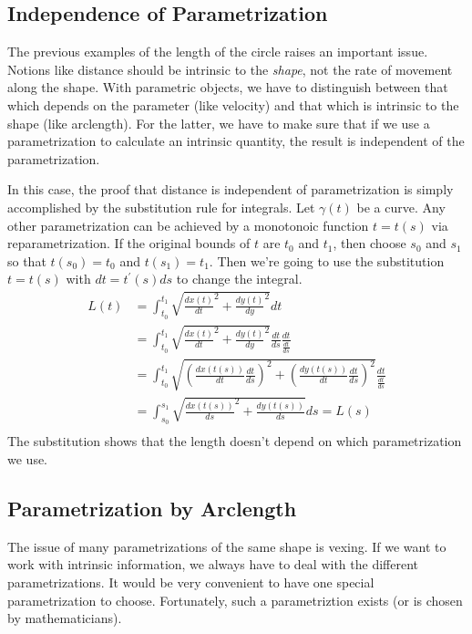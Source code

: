 \documentclass[fleqn]{report}
\begin{document}
\subsection{Independence of Parametrization}
\label{independence-parametrization}

The previous examples of the length of the circle raises an
important issue. Notions like distance should be intrinsic
to the \emph{shape}, not the rate of movement along the shape.
With parametric objects, we have to distinguish between that
which depends on the parameter (like velocity) and that which
is intrinsic to the shape (like arclength). For the
latter, we have to make sure that if we use a parametrization
to calculate an intrinsic quantity, the result is independent
of the parametrization.

In this case, the proof that distance is independent of
parametrization is simply accomplished by the substitution
rule for integrals. Let $\gamma(t)$ be a curve. Any other
parametrization can be achieved by a monotonoic function $t =
t(s)$ via reparametrization. If the original bounds of $t$
are $t_0$ and $t_1$, then choose $s_0$ and $s_1$ so that
$t(s_0) = t_0$ and $t(s_1) = t_1$. Then we're going to use the
substitution $t = t(s)$ with $dt = t^\prime(s) ds$ to change
the integral. 
\begin{align*}
L(t) & = \int_{t_0}^{t_1} \sqrt{ \frac{dx(t)}{dt}^2 +
\frac{dy(t)}{dy}^2} dt \\
& = \int_{t_0}^{t_1} \sqrt{ \frac{dx(t)}{dt}^2 +
\frac{dy(t)}{dy}^2} \frac{dt}{ds} \frac{dt}{\frac{dt}{ds}} \\
& = \int_{t_0}^{t_1} \sqrt{ \left( \frac{dx(t(s))}{dt}
\frac{dt}{ds} \right)^2 +\left( \frac{dy(t(s))}{dt}
\frac{dt}{ds} \right)^2} \frac{dt}{\frac{dt}{ds}} \\
& = \int_{s_0}^{s_1} \sqrt{\frac{dx(t(s))}{ds}^2 +
\frac{dy(t(s))}{ds}} ds = L(s)\\
\end{align*}
The substitution shows that the length doesn't depend on which
parametrization we use.

\subsection{Parametrization by Arclength}
\label{parametrization-arclength}

The issue of many parametrizations of the same shape is vexing.
If we want to work with intrinsic information, we always have
to deal with the different parametrizations. It would be very
convenient to have one special parametrization to choose.
Fortunately, such a parametriztion exists (or is chosen by
mathematicians). 
\end{document}
